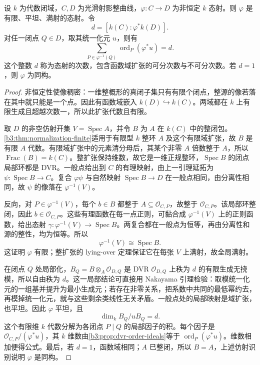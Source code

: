 \begin{proposition}\label{b3:prop:H-curve-morphism}
	设 \(k\) 为代数闭域，\(C,D\) 为光滑射影整曲线，\(\varphi:C\rightarrow D\) 为非恒定 \(k\) 态射。则 \(\varphi\) 是有限、平坦、满射的态射。令
	\[
		d=[k(C):\varphi^*k(D)].
	\]
	对任一闭点 \(Q\in D\)，取其统一化元 \(u\)，则有
	\[
		\sum_{P\in\varphi^{-1}(Q)}\operatorname{ord}_P(\varphi^*u)=d.
	\]
	这个整数 \(d\) 称为态射的次数，包含函数域扩张的可分次数与不可分次数。若 \(d=1\)，则 \(\varphi\) 为同构。
\end{proposition}
\begin{proof}
	非恒定性使像稠密：一维整概形的真闭子集只有有限个闭点，整源的像若落在其中就只能是一个点。因此有函数域嵌入 \(k(D)\hookrightarrow k(C)\)。两域都在 \(k\) 上有限生成且超越次数一，所以此扩张代数且有限。

	取 \(D\) 的非空仿射开集 \(V=\operatorname{Spec}A\)，并令 \(B\) 为 \(A\) 在 \(k(C)\) 中的整闭包。\cref{b3:thm:normalization-finite}适用于有限型 \(k\) 整环 \(A\) 及这个有限域扩张，故 \(B\) 是有限 \(A\) 代数。有限域扩张中的元素清分母后，其某个非零 \(A\) 倍数整于 \(A\)，所以 \(\operatorname{Frac}(B)=k(C)\)。整扩张保持维数，故它是一维正规整环，\(\operatorname{Spec}B\) 的闭点局部环都是 DVR。一般点给出到 \(C\) 的有理映射，由上一引理延拓为 \(\psi:\operatorname{Spec}B\rightarrow C\)。复合 \(\varphi\psi\) 与自然映射 \(\operatorname{Spec}B\rightarrow D\) 在一般点相同，由分离性相同，故 \(\psi\) 的像落在 \(\varphi^{-1}(V)\)。

	反向，对 \(P\in\varphi^{-1}(V)\)，每个 \(b\in B\) 都整于 \(A\subseteq\mathcal O_{C,P}\)，故整于 \(\mathcal O_{C,P}\)。该局部环整闭，因此 \(b\in\mathcal O_{C,P}\)。这些有理函数在每一点正则，可黏合成 \(\varphi^{-1}(V)\) 上的正则函数，给出态射 \(\gamma:\varphi^{-1}(V)\rightarrow\operatorname{Spec}B\)。两复合都在一般点为恒等，再由分离性和源的整性，均为恒等。所以
	\[
		\varphi^{-1}(V)\cong\operatorname{Spec}B.
	\]
	这证明 \(\varphi\) 有限；整扩张的 lying-over 定理保证它在每张 \(V\) 上满射，故全局满射。

	在闭点 \(Q\) 处局部化，\(B_Q=B\otimes_A\mathcal O_{D,Q}\) 是 DVR \(\mathcal O_{D,Q}\) 上秩为 \(d\) 的有限生成无挠模，所以自由秩为 \(d\)。这一局部结论可直接用 Nakayama 引理检验：取模统一化元的一组基并提升为最小生成元；若存在非零关系，把系数中共同的最低幂约去，再模掉统一化元，就与这些剩余类线性无关矛盾。一般点处的局部映射是域扩张，也平坦。因此 \(\varphi\) 平坦，且
	\[
		\dim_k B_Q/uB_Q=d.
	\]
	这个有限维 \(k\) 代数分解为各闭点 \(P\mid Q\) 的局部因子的积。每个因子是 \(\mathcal O_{C,P}/(\varphi^*u)\)，其 \(k\) 维数由\cref{b3:prop:dvr-order-ideals}等于 \(\operatorname{ord}_P(\varphi^*u)\)。维数相加便得公式。最后，若 \(d=1\)，函数域相同；\(A\) 已整闭，所以 \(B=A\)，上述仿射识别说明 \(\varphi\) 是同构。
\end{proof}

